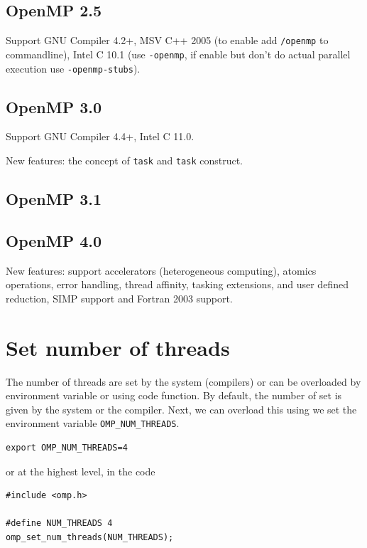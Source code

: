 \subsection{OpenMP 2.5}

Support GNU Compiler 4.2+, MSV C++ 2005 (to enable add \verb!/openmp! to
commandline), Intel C 10.1 (use \verb!-openmp!, if enable but don't do actual
parallel execution use \verb!-openmp-stubs!).

\subsection{OpenMP 3.0}

Support GNU Compiler 4.4+, Intel C 11.0.

New features: the concept of \verb!task! and \verb!task! construct.

\subsection{OpenMP 3.1}


\subsection{OpenMP 4.0}

New features: support accelerators (heterogeneous computing), atomics
operations, error handling, thread affinity, tasking extensions, and user
defined reduction, SIMP support and Fortran 2003 support.


\section{Set number of threads}
\label{sec:set_num_threads}

The number of threads are set by the system (compilers) or can be overloaded by
environment variable or using code function. By default, the number of set is
given by the system or the compiler. Next, we can overload this using we set the
environment variable \verb!OMP_NUM_THREADS!.
\begin{verbatim}
export OMP_NUM_THREADS=4
\end{verbatim}

or at the highest level, in the code
\begin{verbatim}
#include <omp.h>

#define NUM_THREADS 4
omp_set_num_threads(NUM_THREADS);
\end{verbatim}




